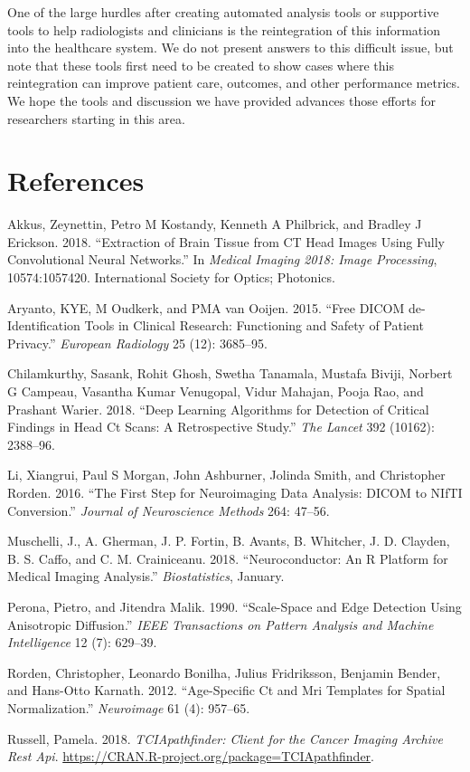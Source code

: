 \documentclass[]{elsarticle} %
\begin{document}
One of the large hurdles after creating automated analysis tools or supportive tools to help radiologists and clinicians is the reintegration of this information into the healthcare system. We do not present answers to this difficult issue, but note that these tools first need to be created to show cases where this reintegration can improve patient care, outcomes, and other performance metrics. We hope the tools and discussion we have provided advances those efforts for researchers starting in this area.

\hypertarget{references}{%
\section*{References}\label{references}}

\hypertarget{refs}{}
\leavevmode\hypertarget{ref-ct_bet}{}%
Akkus, Zeynettin, Petro M Kostandy, Kenneth A Philbrick, and Bradley J Erickson. 2018. ``Extraction of Brain Tissue from CT Head Images Using Fully Convolutional Neural Networks.'' In \emph{Medical Imaging 2018: Image Processing}, 10574:1057420. International Society for Optics; Photonics.

\leavevmode\hypertarget{ref-aryanto2015free}{}%
Aryanto, KYE, M Oudkerk, and PMA van Ooijen. 2015. ``Free DICOM de-Identification Tools in Clinical Research: Functioning and Safety of Patient Privacy.'' \emph{European Radiology} 25 (12): 3685--95.

\leavevmode\hypertarget{ref-cq500}{}%
Chilamkurthy, Sasank, Rohit Ghosh, Swetha Tanamala, Mustafa Biviji, Norbert G Campeau, Vasantha Kumar Venugopal, Vidur Mahajan, Pooja Rao, and Prashant Warier. 2018. ``Deep Learning Algorithms for Detection of Critical Findings in Head Ct Scans: A Retrospective Study.'' \emph{The Lancet} 392 (10162): 2388--96.

\leavevmode\hypertarget{ref-dcm2niix}{}%
Li, Xiangrui, Paul S Morgan, John Ashburner, Jolinda Smith, and Christopher Rorden. 2016. ``The First Step for Neuroimaging Data Analysis: DICOM to NIfTI Conversion.'' \emph{Journal of Neuroscience Methods} 264: 47--56.

\leavevmode\hypertarget{ref-neuroconductor}{}%
Muschelli, J., A. Gherman, J. P. Fortin, B. Avants, B. Whitcher, J. D. Clayden, B. S. Caffo, and C. M. Crainiceanu. 2018. ``Neuroconductor: An R Platform for Medical Imaging Analysis.'' \emph{Biostatistics}, January.

\leavevmode\hypertarget{ref-peronamalik}{}%
Perona, Pietro, and Jitendra Malik. 1990. ``Scale-Space and Edge Detection Using Anisotropic Diffusion.'' \emph{IEEE Transactions on Pattern Analysis and Machine Intelligence} 12 (7): 629--39.

\leavevmode\hypertarget{ref-rorden2012age}{}%
Rorden, Christopher, Leonardo Bonilha, Julius Fridriksson, Benjamin Bender, and Hans-Otto Karnath. 2012. ``Age-Specific Ct and Mri Templates for Spatial Normalization.'' \emph{Neuroimage} 61 (4): 957--65.

\leavevmode\hypertarget{ref-TCIApathfinder}{}%
Russell, Pamela. 2018. \emph{TCIApathfinder: Client for the Cancer Imaging Archive Rest Api}. \url{https://CRAN.R-project.org/package=TCIApathfinder}.
\end{document}
